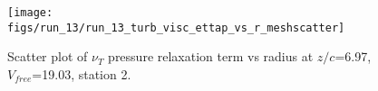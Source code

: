 \begin{figure}[H]
\centering
\texttt{[image: figs/run\_13/run\_13\_turb\_visc\_ettap\_vs\_r\_meshscatter]}
\caption{Scatter plot of $\nu_T$ pressure relaxation term vs radius at $z/c$=6.97, $V_{free}$=19.03, station 2.}
\label{fig:run_13_turb_visc_ettap_vs_r_meshscatter}
\end{figure}


